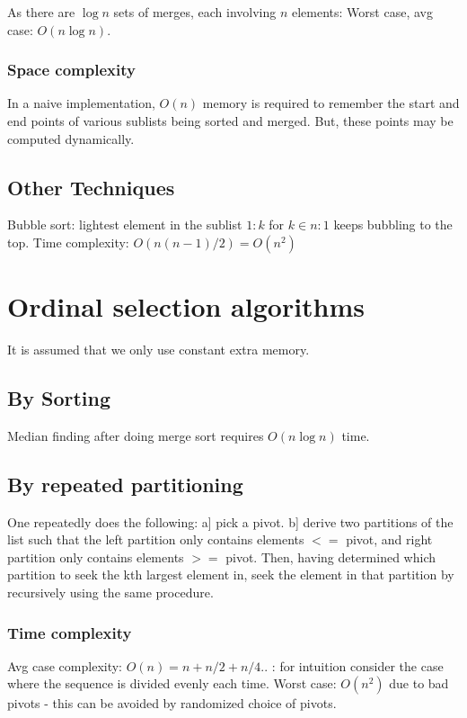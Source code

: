 \documentclass[oneside, article]{memoir}
\begin{document}
As there are $\log n$ sets of merges, each involving $n$ elements: Worst case, avg case: $O(n \log n)$.

\subsubsection{Space complexity}
In a naive implementation, $O(n)$ memory is required to remember the start and end points of various sublists being sorted and merged. But, these points may be computed dynamically.

\subsection{Other Techniques}
Bubble sort: lightest element in the sublist $1:k$ for $k \in n:1$ keeps bubbling to the top. Time complexity: $O(n(n-1)/2) = O(n^{2})$

\section{Ordinal selection algorithms}
It is assumed that we only use constant extra memory.

\subsection{By Sorting}
Median finding after doing merge sort requires $O(n \log n)$ time.

\subsection{By repeated partitioning}
One repeatedly does the following: a] pick a pivot. b] derive two partitions of the list such that the left partition only contains elements $<=$ pivot, and right partition only contains elements $>=$ pivot. Then, having determined which partition to seek the kth largest element in, seek the element in that partition by recursively using the same procedure.

\subsubsection{Time complexity}
Avg case complexity: $O(n) = n + n/2 + n/4 ..$ : for intuition consider the case where the sequence is divided evenly each time. Worst case: $O(n^2)$ due to bad pivots - this can be avoided by randomized choice of pivots.

\tbc
\end{document}

